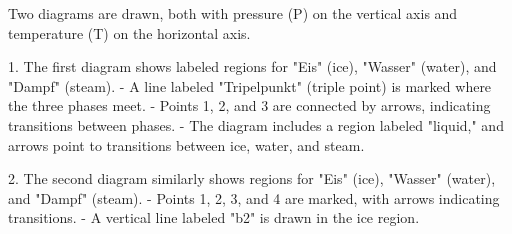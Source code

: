 Two diagrams are drawn, both with pressure (P) on the vertical axis and temperature (T) on the horizontal axis.  

1. The first diagram shows labeled regions for "Eis" (ice), "Wasser" (water), and "Dampf" (steam).  
   - A line labeled "Tripelpunkt" (triple point) is marked where the three phases meet.  
   - Points 1, 2, and 3 are connected by arrows, indicating transitions between phases.  
   - The diagram includes a region labeled "liquid," and arrows point to transitions between ice, water, and steam.  

2. The second diagram similarly shows regions for "Eis" (ice), "Wasser" (water), and "Dampf" (steam).  
   - Points 1, 2, 3, and 4 are marked, with arrows indicating transitions.  
   - A vertical line labeled "b2" is drawn in the ice region.